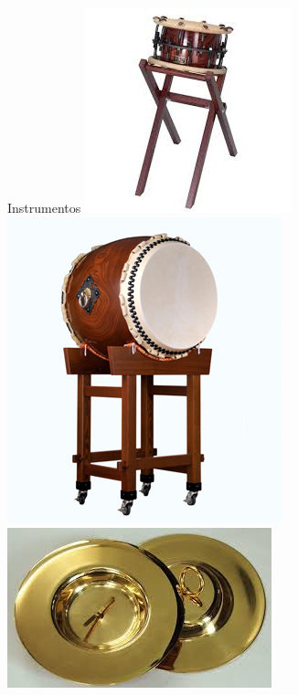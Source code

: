 \documentclass{beamer}
\begin{document}
\begin{frame}{Instrumentos}
    \includegraphics[height=0.2\textheight]{instrumentos-8}
    \includegraphics[height=0.2\textheight]{instrumentos-9}
    \includegraphics[height=0.2\textheight]{instrumentos-10}

\end{frame}
\end{document}
